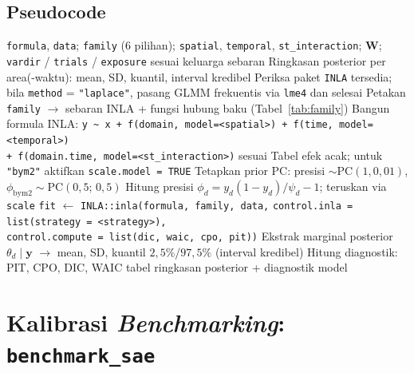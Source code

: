 \documentclass[11pt,a4paper]{article}
\theoremstyle{definition}
\begin{document}
\subsection{Pseudocode}

\begin{algorithm}[H]
\caption{\texttt{hb\_area}: GLMM hierarkis area-level via INLA}
\label{alg:hb}
\begin{algorithmic}[1]
\Require \texttt{formula}, \texttt{data}; \texttt{family} (6 pilihan);
  \texttt{spatial}, \texttt{temporal}, \texttt{st\_interaction}; $\mathbf{W}$;
  \texttt{vardir} / \texttt{trials} / \texttt{exposure} sesuai keluarga sebaran
\Ensure Ringkasan posterior per area(-waktu): mean, SD, kuantil, interval kredibel
\State Periksa paket \texttt{INLA} tersedia; bila \texttt{method} = \texttt{"laplace"},
  pasang GLMM frekuentis via \texttt{lme4} dan selesai
\State Petakan \texttt{family} $\to$ sebaran INLA + fungsi hubung baku
  (Tabel~\ref{tab:family})
\State Bangun formula INLA:
  \texttt{y \~{} x + f(domain, model=<spatial>) + f(time, model=<temporal>)} \\
  \hspace*{1.2em}\texttt{+ f(domain.time, model=<st\_interaction>)}
  sesuai Tabel efek acak; untuk \texttt{"bym2"} aktifkan \texttt{scale.model = TRUE}
\State Tetapkan prior PC: presisi $\sim \mathrm{PC}(1, 0{,}01)$,
  $\phi_{\text{bym2}} \sim \mathrm{PC}(0{,}5;\, 0{,}5)$
  \State Hitung presisi $\phi_d = y_d(1-y_d)/\psi_d - 1$; teruskan via \texttt{scale}
\EndIf
\State \texttt{fit} $\gets$ \texttt{INLA::inla(formula, family, data,}
  \texttt{control.inla = list(strategy = <strategy>),} \\
  \hspace*{1.2em}\texttt{control.compute = list(dic, waic, cpo, pit))}
\State Ekstrak marginal posterior $\theta_d \mid \mathbf{y}$ $\to$
  mean, SD, kuantil $2{,}5\%$/$97{,}5\%$ (interval kredibel)
\State Hitung diagnostik: PIT, CPO, DIC, WAIC
\State \Return tabel ringkasan posterior + diagnostik model
\end{algorithmic}
\end{algorithm}

\section{Kalibrasi \emph{Benchmarking}: \texttt{benchmark\_sae}}
\end{document}
